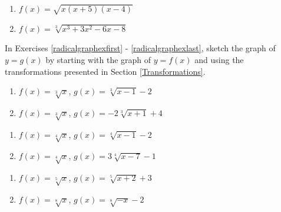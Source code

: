 \begin{multicols}{2}
\begin{enumerate}
\setcounter{enumi}{\value{HW}}

\item $f(x) = \sqrt{x(x + 5)(x - 4)}$
\item $f(x) = \sqrt[3]{x^{3} + 3x^{2} - 6x - 8}$ \label{algfcngraphexlast}

\setcounter{HW}{\value{enumi}}
\end{enumerate}
\end{multicols}


In Exercises \ref{radicalgraphexfirst} - \ref{radicalgraphexlast}, sketch the graph of $y=g(x)$ by starting with the graph of $y = f(x)$ and using the transformations presented in Section \ref{Transformations}. 

\begin{multicols}{2}
\begin{enumerate}
\setcounter{enumi}{\value{HW}}

\item $f(x) = \sqrt[3]{x}$, $g(x) = \sqrt[3]{x-1}-2$ \label{radicalgraphexfirst}
\item $f(x) = \sqrt[3]{x}$, $g(x) = -2\sqrt[3]{x + 1} + 4$ 

\setcounter{HW}{\value{enumi}}
\end{enumerate}
\end{multicols}

\begin{multicols}{2}
\begin{enumerate}
\setcounter{enumi}{\value{HW}}

\item $f(x) = \sqrt[4]{x}$, $g(x) = \sqrt[4]{x-1}-2$
\item $f(x) = \sqrt[4]{x}$, $g(x) = 3\sqrt[4]{x - 7} - 1$

\setcounter{HW}{\value{enumi}}
\end{enumerate}
\end{multicols}

\begin{multicols}{2}
\begin{enumerate}
\setcounter{enumi}{\value{HW}}

\item $f(x) = \sqrt[5]{x}$, $g(x) = \sqrt[5]{x + 2} + 3$
\item $f(x) = \sqrt[8]{x}$, $g(x) = \sqrt[8]{-x} - 2$ \label{radicalgraphexlast}
\setcounter{HW}{\value{enumi}}
\end{enumerate}

\end{multicols}

